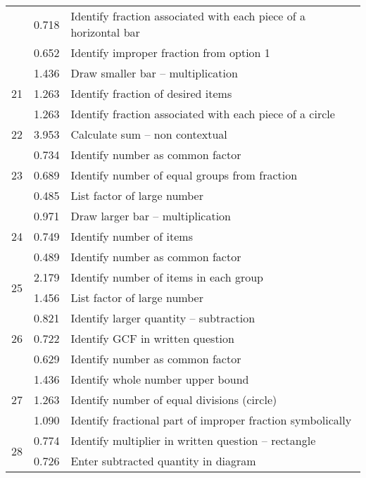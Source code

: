 \begin{longtable}[c]{|c|c|l|}
 & \small 0.718 & \small Identify fraction associated with each piece of a horizontal bar \\
 & \small 0.652 & \small Identify improper fraction from option 1 \\
\hline
\multirow{3}{*}{\small 21} & \small 1.436 & \small Draw smaller bar -- multiplication \\
 & \small 1.263 & \small Identify fraction of desired items \\
 & \small 1.263 & \small Identify fraction associated with each piece of a circle \\
\hline
\multirow{1}{*}{\small 22} & \small 3.953 & \small Calculate sum -- non contextual \\
\hline
\multirow{3}{*}{\small 23} & \small 0.734 & \small Identify number as common factor \\
 & \small 0.689 & \small Identify number of equal groups from fraction \\
 & \small 0.485 & \small List factor of large number \\
\hline
\multirow{3}{*}{\small 24} & \small 0.971 & \small Draw larger bar -- multiplication \\
 & \small 0.749 & \small Identify number of items \\
 & \small 0.489 & \small Identify number as common factor \\
\hline
\multirow{2}{*}{\small 25} & \small 2.179 & \small Identify number of items in each group \\
 & \small 1.456 & \small List factor of large number \\
\hline
\multirow{3}{*}{\small 26} & \small 0.821 & \small Identify larger quantity -- subtraction \\
 & \small 0.722 & \small Identify GCF in written question \\
 & \small 0.629 & \small Identify number as common factor \\
\hline
\multirow{3}{*}{\small 27} & \small 1.436 & \small Identify whole number upper bound \\
 & \small 1.263 & \small Identify number of equal divisions (circle) \\
 & \small 1.090 & \small Identify fractional part of improper fraction symbolically \\
\hline
\multirow{3}{*}{\small 28} & \small 0.774 & \small Identify multiplier in written question -- rectangle \\
 & \small 0.726 & \small Enter subtracted quantity in diagram \\

\end{longtable}
